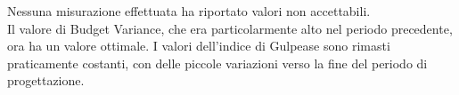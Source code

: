 Nessuna misurazione effettuata ha riportato valori non accettabili.\\
Il valore di Budget Variance, che era particolarmente alto nel periodo precedente, ora ha un valore ottimale.
I valori dell'indice di Gulpease sono rimasti praticamente costanti, con delle piccole variazioni verso la fine del periodo di progettazione.